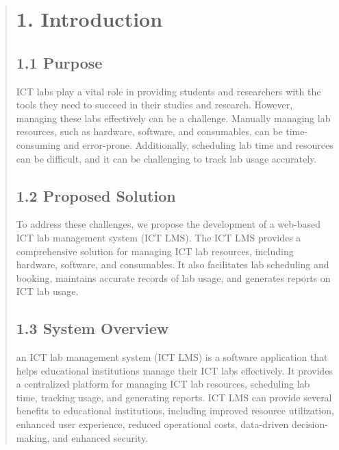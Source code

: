 \documentclass[12pt]{report}
\begin{document}
	
	\begin{quote}
		\section{1. Introduction}
		\subsection{1.1 Purpose}
		\hspace{1cm}ICT labs play a vital role in providing students and researchers with the tools they need to succeed in their studies and research. However, managing these labs effectively can be a challenge. Manually managing lab resources, such as hardware, software, and consumables, can be time-consuming and error-prone. Additionally, scheduling lab time and resources can be difficult, and it can be challenging to track lab usage accurately.
		\subsection{1.2 Proposed Solution}
		\hspace{1cm}To address these challenges, we propose the development of a web-based ICT lab management system (ICT LMS). The ICT LMS provides a comprehensive solution for managing ICT lab resources, including hardware, software, and consumables. It also facilitates lab scheduling and booking, maintains accurate records of lab usage, and generates reports on ICT lab usage.
		\subsection{1.3 System Overview}
		\hspace{1cm}an ICT lab management system (ICT LMS) is a software application that helps educational institutions manage their ICT labs effectively. It provides a centralized platform for managing ICT lab resources, scheduling lab time, tracking usage, and generating reports. ICT LMS can provide several benefits to educational institutions, including improved resource utilization, enhanced user experience, reduced operational costs, data-driven decision-making, and enhanced security.
	\end{quote}
	\clearpage
	
\end{document}
